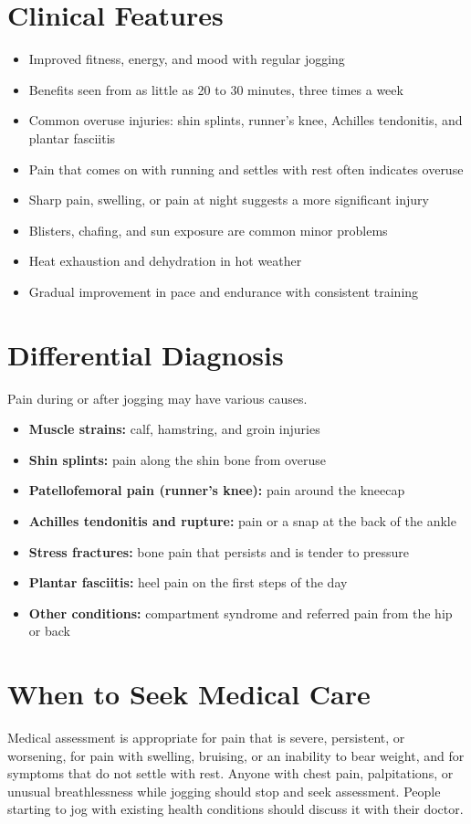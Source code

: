 \section*{Clinical Features}
\begin{itemize}
    \item Improved fitness, energy, and mood with regular jogging
    \item Benefits seen from as little as 20 to 30 minutes, three times a week
    \item Common overuse injuries: shin splints, runner's knee, Achilles tendonitis, and plantar fasciitis
    \item Pain that comes on with running and settles with rest often indicates overuse
    \item Sharp pain, swelling, or pain at night suggests a more significant injury
    \item Blisters, chafing, and sun exposure are common minor problems
    \item Heat exhaustion and dehydration in hot weather
    \item Gradual improvement in pace and endurance with consistent training
\end{itemize}

\section*{Differential Diagnosis}
Pain during or after jogging may have various causes.
\begin{itemize}
    \item \textbf{Muscle strains:} calf, hamstring, and groin injuries
    \item \textbf{Shin splints:} pain along the shin bone from overuse
    \item \textbf{Patellofemoral pain (runner's knee):} pain around the kneecap
    \item \textbf{Achilles tendonitis and rupture:} pain or a snap at the back of the ankle
    \item \textbf{Stress fractures:} bone pain that persists and is tender to pressure
    \item \textbf{Plantar fasciitis:} heel pain on the first steps of the day
    \item \textbf{Other conditions:} compartment syndrome and referred pain from the hip or back
\end{itemize}

\section*{When to Seek Medical Care}
Medical assessment is appropriate for pain that is severe, persistent, or worsening, for pain with swelling, bruising, or an inability to bear weight, and for symptoms that do not settle with rest. Anyone with chest pain, palpitations, or unusual breathlessness while jogging should stop and seek assessment. People starting to jog with existing health conditions should discuss it with their doctor.

